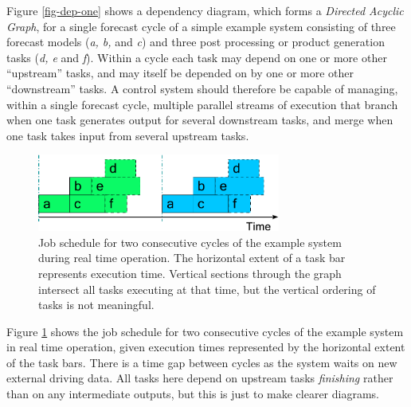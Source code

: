 \documentclass[11pt,a4paper]{article}
\begin{document}
Figure \ref{fig-dep-one} shows a dependency diagram, which forms a {\em
Directed Acyclic Graph}, for a single forecast cycle of a simple example
system consisting of three forecast models ({\em a, b,} and {\em c}) and
three post processing or product generation tasks ({\em d, e} and {\em
f}).  Within a cycle each task may depend on one or more other
``upstream'' tasks, and may itself be depended on by one or more other
``downstream'' tasks.  A control system should therefore be capable of
managing, within a single forecast cycle, multiple parallel streams of
execution that branch when one task generates output for several
downstream tasks, and merge when one task takes input from several
upstream tasks. 

\begin{figure}
    \begin{center}
        \includegraphics[width=8cm]{timeline-one}
    \end{center}
    \caption{\small Job schedule for two consecutive cycles of the
    example system during real time operation. The horizontal extent of
    a task bar represents execution time. Vertical sections through the
    graph intersect all tasks executing at that time, but the vertical
    ordering of tasks is not meaningful.}
    \label{fig-time-one}
\end{figure}

Figure \ref{fig-time-one} shows the job schedule for two consecutive
cycles of the example system in real time operation, given execution
times represented by the horizontal extent of the task bars. There is a
time gap between cycles as the system waits on new external driving
data. 
All tasks here depend on upstream tasks {\em finishing} rather than on
any intermediate outputs, but this is just to make clearer diagrams.
\end{document}
